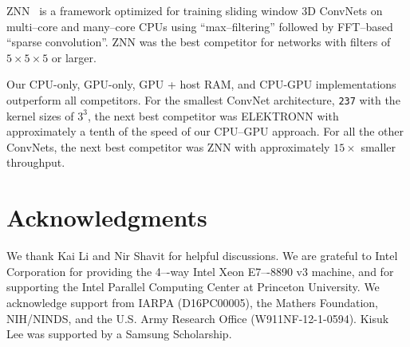 \documentclass[conference]{./IEEEtran/IEEEtran}
\begin{document}
  ZNN~\cite{zlateski2015znn} is a framework optimized for training
  sliding window 3D ConvNets on multi--core and many--core CPUs using
  ``max--filtering'' followed by FFT--based ``sparse convolution''.
  ZNN was the best competitor for networks with filters of $5 \times 5
  \times 5$ or larger.

  Our CPU-only, GPU-only, GPU + host RAM, and CPU-GPU implementations
  outperform all competitors.  For the smallest ConvNet architecture,
  {\tt 237} with the kernel sizes of $3^3$, the next best competitor
  was ELEKTRONN with approximately a tenth of the speed of our
  CPU--GPU approach. For all the other ConvNets, the next best
  competitor was ZNN with approximately $15 \times$ smaller
  throughput.



\section*{Acknowledgments}
We thank Kai Li and Nir Shavit for helpful discussions.  We are
grateful to Intel Corporation for providing the 4–-way Intel Xeon
E7–-8890 v3 machine, and for supporting the Intel Parallel Computing
Center at Princeton University.  We acknowledge support from IARPA
(D16PC00005), the Mathers Foundation, NIH/NINDS, and the U.S. Army
Research Office (W911NF-12-1-0594). Kisuk Lee was supported by a
Samsung Scholarship.




\end{document}
